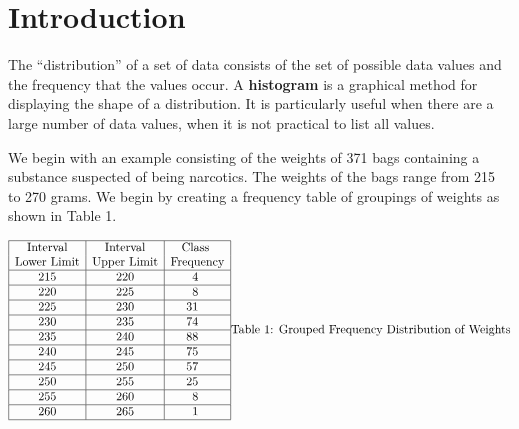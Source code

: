 \documentclass[
]{book}
\begin{document}
\hypertarget{introduction-1}{%
\section{Introduction}\label{introduction-1}}

The ``distribution'' of a set of data consists of the set of possible data values and the
frequency that the values occur.
A \textbf{histogram} is a graphical method for displaying the shape of a distribution.
It is particularly useful when there are a large number of data values, when
it is not practical to list all values.

We begin with an example consisting of the weights of 371 bags containing a
substance suspected of being narcotics. The weights of the bags range from
215 to 270 grams. We begin by creating a frequency table of groupings of weights
as shown in Table 1.

\[
\begin{array}{|c|c|r|} \hline
\mathrm{Interval} & \mathrm{Interval} & \mathrm{Class}\hspace{.175in}\\
\text{Lower Limit} & \text{Upper Limit} & \mathrm{Frequency} \\ \hline
215 & 220 & 4\hspace{.3in} \\  \hline
220 & 225  & 8\hspace{.3in} \\  \hline
225 & 230 & 31\hspace{.3in} \\  \hline
230 & 235 & 74\hspace{.3in} \\  \hline
235 & 240 & 88\hspace{.3in} \\  \hline
240 & 245 & 75\hspace{.3in} \\  \hline
245 & 250 & 57\hspace{.3in} \\  \hline
250 & 255 & 25\hspace{.3in} \\  \hline
255 & 260 & 8\hspace{.3in} \\  \hline
260 & 265 & 1\hspace{.3in} \\  \hline
\end{array}\\
\mbox{Table 1: Grouped Frequency Distribution of Weights}
\]
\end{document}
